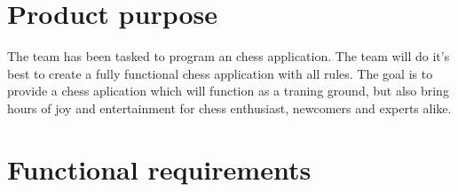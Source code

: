 \documentclass{article}
\begin{document}
\maketitle
\section*{Product purpose}
The team has been tasked to program an chess application. The team will do it's best to create a fully functional chess application with all rules. The goal is to provide a chess aplication which will function as a traning ground, but also bring hours of joy and entertainment for chess enthusiast, newcomers and experts alike.
\section*{Functional requirements}
\end{document}
